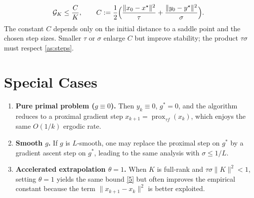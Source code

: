 \documentclass{article}
\newcommand{\prox}{\operatorname{prox}}
\begin{document}
\[
\mathcal G_{K}\le
\frac{C}{K},
\qquad
C:=\frac{1}{2}\Bigl(\frac{\|x_{0}-x^{\star}\|^{2}}{\tau}
+\frac{\|y_{0}-y^{\star}\|^{2}}{\sigma}\Bigr).
\] 
The constant $C$ depends only on the initial distance to a saddle point and the chosen step sizes. Smaller $\tau$ or $\sigma$ enlarge $C$ but improve stability; the product $\tau\sigma$ must respect \eqref{as:steps}.

\section*{Special Cases}
\begin{enumerate}
\item \textbf{Pure primal problem ($g\equiv0$).} Then $y_{k}\equiv0$, $g^{*}=0$, and the algorithm reduces to a proximal gradient step $x_{k+1}= \prox_{\tau f}(x_{k})$, which enjoys the same $O(1/k)$ ergodic rate.
\item \textbf{Smooth $g$.} If $g$ is $L$‑smooth, one may replace the proximal step on $g^{*}$ by a gradient ascent step on $g^{*}$, leading to the same analysis with $\sigma\le 1/L$.
\item \textbf{Accelerated extrapolation $\theta=1$.} When $K$ is full‑rank and $\tau\sigma\|K\|^{2}<1$, setting $\theta=1$ yields the same bound \eqref{5} but often improves the empirical constant because the term $\|x_{k+1}-x_{k}\|^{2}$ is better exploited.
\end{enumerate}
\end{document}
